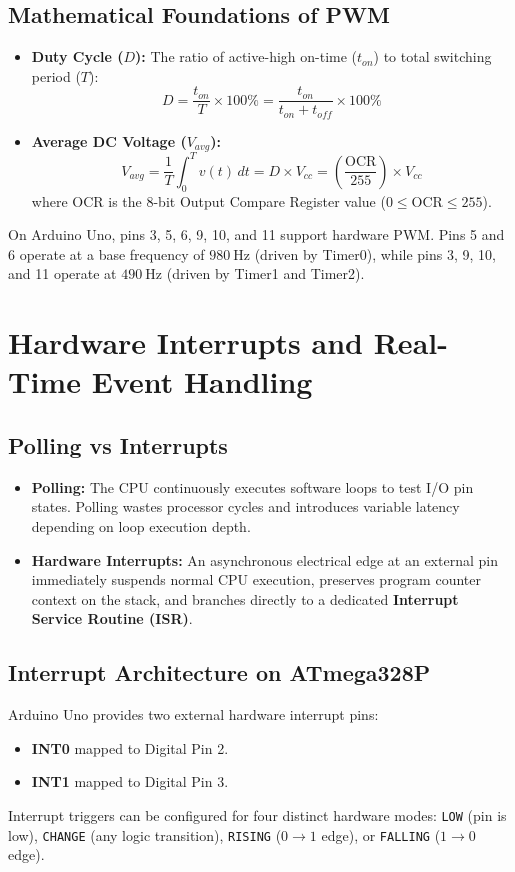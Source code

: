 \subsection{Mathematical Foundations of PWM}
\begin{itemize}
    \item \textbf{Duty Cycle ($D$):} The ratio of active-high on-time ($t_{on}$) to total switching period ($T$):
    \begin{equation}
    D = \frac{t_{on}}{T} \times 100\% = \frac{t_{on}}{t_{on} + t_{off}} \times 100\%
    \end{equation}
    \item \textbf{Average DC Voltage ($V_{avg}$):}
    \begin{equation}
    V_{avg} = \frac{1}{T} \int_0^T v(t)\,dt = D \times V_{cc} = \left( \frac{\text{OCR}}{255} \right) \times V_{cc}
    \end{equation}
    where $\text{OCR}$ is the 8-bit Output Compare Register value ($0 \le \text{OCR} \le 255$).
\end{itemize}

On Arduino Uno, pins 3, 5, 6, 9, 10, and 11 support hardware PWM. Pins 5 and 6 operate at a base frequency of $\SI{980}{\hertz}$ (driven by Timer0), while pins 3, 9, 10, and 11 operate at $\SI{490}{\hertz}$ (driven by Timer1 and Timer2).

\section{Hardware Interrupts and Real-Time Event Handling}
\subsection{Polling vs Interrupts}
\begin{itemize}
    \item \textbf{Polling:} The CPU continuously executes software loops to test I/O pin states. Polling wastes processor cycles and introduces variable latency depending on loop execution depth.
    \item \textbf{Hardware Interrupts:} An asynchronous electrical edge at an external pin immediately suspends normal CPU execution, preserves program counter context on the stack, and branches directly to a dedicated \textbf{Interrupt Service Routine (ISR)}.
\end{itemize}

\subsection{Interrupt Architecture on ATmega328P}
Arduino Uno provides two external hardware interrupt pins:
\begin{itemize}
    \item \textbf{INT0} mapped to Digital Pin 2.
    \item \textbf{INT1} mapped to Digital Pin 3.
\end{itemize}
Interrupt triggers can be configured for four distinct hardware modes: \texttt{LOW} (pin is low), \texttt{CHANGE} (any logic transition), \texttt{RISING} ($0 \to 1$ edge), or \texttt{FALLING} ($1 \to 0$ edge).

